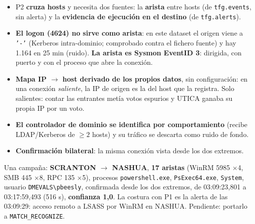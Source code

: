 \documentclass[11pt,a4paper]{article}
\newcommand{\cod}[1]{\texttt{#1}}
\newcommand{\flecha}{$\rightarrow$}
\begin{document}
\begin{itemize}
  \item P2 \textbf{cruza hosts} y necesita dos fuentes: la \textbf{arista} entre hosts (de \cod{tfg.events}, sin
        alerta) y la \textbf{evidencia de ejecución en el destino} (de \cod{tfg.alerts}).
  \item \textbf{El logon (4624) no sirve como arista}: en este dataset el origen viene a \cod{'-'} (Kerberos
        intra-dominio; comprobado contra el fichero fuente) y hay 1.164 en 25 min (ruido). \textbf{La arista es
        Sysmon EventID 3}: dirigida, con puerto y con el proceso que abre la conexión.
  \item \textbf{Mapa IP \flecha{} host derivado de los propios datos}, sin configuración: en una conexión
        \textit{saliente}, la IP de origen es la del host que la registra. Solo salientes: contar las
        entrantes metía votos espurios y UTICA ganaba su propia IP por un voto.
  \item \textbf{El controlador de dominio se identifica por comportamiento} (recibe LDAP/Kerberos de $\geq 2$
        hosts) y su tráfico se descarta como ruido de fondo.
  \item \textbf{Confirmación bilateral}: la misma conexión vista desde los dos extremos.
\end{itemize}

\begin{dato}
Una campaña: \textbf{SCRANTON \flecha{} NASHUA}, \textbf{17 aristas} (WinRM 5985 $\times$4, SMB 445 $\times$8,
RPC 135 $\times$5), procesos \cod{powershell.exe}, \cod{PsExec64.exe}, \cod{System}, usuario \cod{DMEVALS\textbackslash pbeesly},
confirmada desde los dos extremos, de 03:09:23,801 a 03:17:59,493 (516 s), \textbf{confianza 1,0}.
La costura con P1 es la alerta de las 03:09:29: acceso remoto a LSASS por WinRM en NASHUA.
Pendiente: portarlo a \cod{MATCH\_RECOGNIZE}.
\end{dato}
\end{document}
